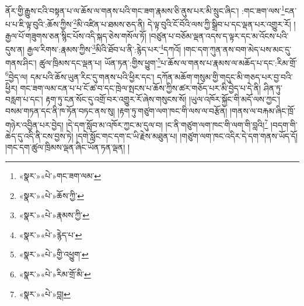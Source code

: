 ནོར་གྱི་རྒྱུས་ངའི་བསྟན་པ་ལ་ཆོས་ལ་གནས་པའི་གང་ཟག་རྣམས་ཅི་ནུས་པར་མི་སྲུང་ཞིང་། :གང་ཟག་ལས་\footnote{«སྣར་»«པེ་»གང་ཟག་ལམ་}ངན་པ་པ་ཇི་ལྟ་བུའི་:ཆོས་ཀྱིས་\footnote{«སྣར་»«པེ་»ཆོས་ཀྱི་}མི་འཛིན་པ་ཐམས་ཅད་ནི། དེ་ལྟ་བུའི་ངོ་བོའི་ལས་ཀྱི་སྒྲིབ་པ་དང་ལྡན་པར་འགྱུར་རོ། །རྒྱལ་པོ་གཟུགས་ཅན་སྙིང་པོས་འདི་སྐད་ཅེས་གསོལ་ཏོ། །བཙུན་པ་བཅོམ་ལྡན་འདས་ད་ལྟར་དང་མ་འོངས་པའི་དུས་ན། རྒྱལ་རིགས་:རྣམས་ཀྱིས་\footnote{«སྣར་»«པེ་»རྣམས་ཀྱི་}མིའི་ཐོབ་པ་ནི་:རྙེད་པར་\footnote{«སྣར་»«པེ་»རྙེད་པ་}དཀའོ། །གང་དག་ཀུན་ནས་བག་མེད་པས་མང་དུ་གནས་ཤིང་། ཚུལ་ཁྲིམས་དང་ལྡན་པ། ཡོན་ཏན་:གྱིས་ཕྱུག་\footnote{«སྣར་»«པེ་»གྱི་འཕྱུག་}པ་ཆོས་ལ་གནས་པ་རྣམས་ལ་མཆོད་པ་དང་:རིམ་གྲོ་\footnote{«སྣར་»«པེ་»རིམ་གྲོ་མི་}བྱེད་ལ། དམ་པའི་ཆོས་ཡུན་རིང་དུ་གནས་པའི་ཕྱིར་དང་། དཀོན་མཆོག་གསུམ་གྱི་གདུང་མི་གཅད་པར་བྱ་བའི་ཕྱིར། གང་ཟག་ལམ་ངན་པ་པ་ངོ་ཚ་བ་དང་ཁྲེལ་སྤངས་པ་ཆོས་ཀྱིས་ཚར་གཅོད་པར་མི་བྱེད་པ་དེ་ནི། ཤིན་ཏུ་བརླག་པ་དང་། རྟག་ཏུ་ངན་སོང་དུ་འགྲོ་བར་འགྱུར་རོ་ཞེས་གསུངས་སོ། །ཡུལ་འཁོར་སྐྱོང་གི་མདོ་ལས་ཀྱང་། བསམ་གཏན་དང་ནི་ཁ་ཏོན་བཏང་ནས་སུ། །རྟག་ཏུ་གཙུག་ལག་ཁང་གི་ལས་ལ་བརྩོན། །གནས་ལ་བརྐམ་ཞིང་ཁྲོ་གཉེར་འབྱིན་པར་བྱེད། །དེ་དག་སློབ་མ་འཁོར་ཀྱང་མ་དུལ་བ། །ང་ནི་གཙུག་ལག་ཁང་གི་ལག་གི་བླའི།\footnote{«སྣར་»«པེ་»བླ།} །བདག་གི་ཆེད་དུ་འདི་ནི་ངས་བྱས་ཏེ། །དགེ་སློང་གང་དག་ང་ཡི་རྗེས་མཐུན་པ། །གཙུག་ལག་ཁང་འདིར་དེ་དག་གནས་ཡོད་དོ། །གང་དག་ཚུལ་ཁྲིམས་ལྡན་ཞིང་ཡོན་ཏན་ལྡན། །
